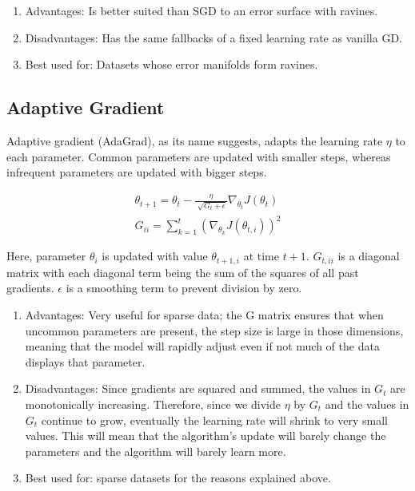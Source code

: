 \documentclass[twoside,11pt]{homework}
\begin{document}
\begin{enumerate}
	\item Advantages: Is better suited than SGD to an error surface with ravines.
	\item Disadvantages: Has the same fallbacks of a fixed learning rate as vanilla GD.
	\item Best used for: Datasets whose error manifolds form ravines.
\end{enumerate}

\subsection*{Adaptive Gradient}
Adaptive gradient (AdaGrad), as its name suggests, adapts the learning rate $\eta$ to each parameter. Common parameters are updated with smaller steps, whereas infrequent parameters are updated with bigger steps.

\begin{align*}
	\theta_{t+1} = \theta_{t} - \frac{\eta}{\sqrt[]{G_{t}+\epsilon}} \nabla_{\theta_t} J(\theta_{t})\\
	G_{ii} = \sum^t_{k=1} (\nabla_{\theta_k} J(\theta_{t, i}))^2
\end{align*}

Here, parameter $\theta_i$ is updated with value $\theta_{t+1, i}$ at time $t+1$. $G_{t, ii}$ is a diagonal matrix with each diagonal term being the sum of the squares of all past gradients. $\epsilon$ is a smoothing term to prevent division by zero.
 

\begin{enumerate}
	\item Advantages: Very useful for sparse data; the G matrix ensures that when uncommon parameters are present, the step size is large in those dimensions, meaning that the model will rapidly adjust even if not much of the data displays that parameter.
	\item Disadvantages: Since gradients are squared and summed, the values in $G_t$ are monotonically increasing. Therefore, since we divide $\eta$ by $G_t$ and the values in $G_t$ continue to grow, eventually the learning rate will shrink to very small values. This will mean that the algorithm's update will barely change the parameters and the algorithm will barely learn more.
	\item Best used for: sparse datasets for the reasons explained above.
\end{enumerate}
\end{document}
